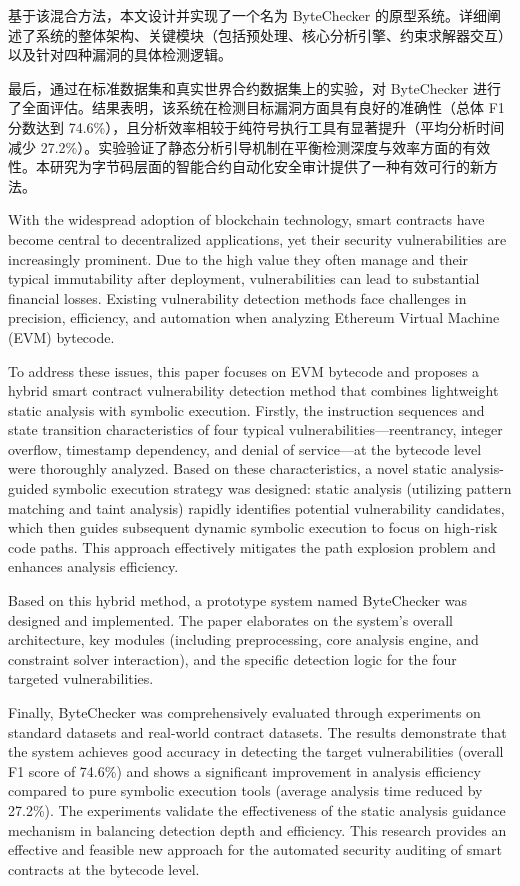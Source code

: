 \documentclass[print, master, vlined, timesmath]{DissertUESTC}
\begin{document}
基于该混合方法，本文设计并实现了一个名为 ByteChecker 的原型系统。详细阐述了系统的整体架构、关键模块（包括预处理、核心分析引擎、约束求解器交互）以及针对四种漏洞的具体检测逻辑。

最后，通过在标准数据集和真实世界合约数据集上的实验，对 ByteChecker 进行了全面评估。结果表明，该系统在检测目标漏洞方面具有良好的准确性（总体 F1 分数达到 74.6\%），且分析效率相较于纯符号执行工具有显著提升（平均分析时间减少 27.2\%）。实验验证了静态分析引导机制在平衡检测深度与效率方面的有效性。本研究为字节码层面的智能合约自动化安全审计提供了一种有效可行的新方法。



\enabstract
With the widespread adoption of blockchain technology, smart contracts have become central to decentralized applications, yet their security vulnerabilities are increasingly prominent. Due to the high value they often manage and their typical immutability after deployment, vulnerabilities can lead to substantial financial losses. Existing vulnerability detection methods face challenges in precision, efficiency, and automation when analyzing Ethereum Virtual Machine (EVM) bytecode.

To address these issues, this paper focuses on EVM bytecode and proposes a hybrid smart contract vulnerability detection method that combines lightweight static analysis with symbolic execution. Firstly, the instruction sequences and state transition characteristics of four typical vulnerabilities—reentrancy, integer overflow, timestamp dependency, and denial of service—at the bytecode level were thoroughly analyzed. Based on these characteristics, a novel static analysis-guided symbolic execution strategy was designed: static analysis (utilizing pattern matching and taint analysis) rapidly identifies potential vulnerability candidates, which then guides subsequent dynamic symbolic execution to focus on high-risk code paths. This approach effectively mitigates the path explosion problem and enhances analysis efficiency.

Based on this hybrid method, a prototype system named ByteChecker was designed and implemented. The paper elaborates on the system's overall architecture, key modules (including preprocessing, core analysis engine, and constraint solver interaction), and the specific detection logic for the four targeted vulnerabilities.

Finally, ByteChecker was comprehensively evaluated through experiments on standard datasets and real-world contract datasets. The results demonstrate that the system achieves good accuracy in detecting the target vulnerabilities (overall F1 score of 74.6\%) and shows a significant improvement in analysis efficiency compared to pure symbolic execution tools (average analysis time reduced by 27.2\%). The experiments validate the effectiveness of the static analysis guidance mechanism in balancing detection depth and efficiency. This research provides an effective and feasible new approach for the automated security auditing of smart contracts at the bytecode level.
\end{document}
